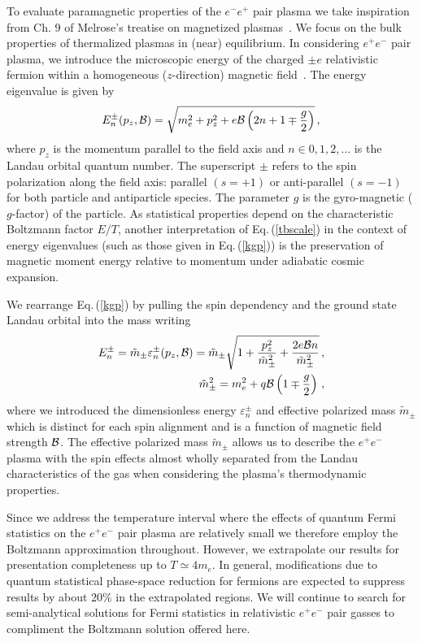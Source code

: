 \documentclass[reprint]{revtex4-2}
\newcommand{\req}[1]{Eq.\,(\ref{#1})}
\newcommand*{\xblue}{\color{black}}
\begin{document}
To evaluate paramagnetic properties of the $e^-e^+$ pair plasma we take inspiration from Ch. 9 of Melrose's treatise on magnetized plasmas~\cite{melrose2008quantum}. We focus  on the bulk properties of thermalized plasmas in (near) equilibrium. In considering $e^{+}e^{-}$ pair plasma, we introduce the microscopic energy of the charged $\pm e$ relativistic fermion within a homogeneous ($z$-direction) magnetic field~\cite{steinmetz2018magnetic}. The energy eigenvalue is given by
\begin{align}
    \label{kgp}
    E^{\pm}_{n}(p_{z},{\cal B})=\sqrt{m_{e}^{2}+p_{z}^{2}+e{\cal B}\left(2n+1\mp\frac{g}{2}\right)}\,,
\end{align}
where $p_{z}$ is the momentum parallel to the field axis and $n\in0,1,2,\ldots$ is the Landau orbital quantum number. The {\xblue superscript} $\pm$ refers to the spin polarization along the field axis: parallel $(s=+1)$ or anti-parallel $(s=-1)$ {\xblue for both particle and antiparticle species.} The parameter $g$ is the gyro-magnetic ($g$-factor) of the particle. As statistical properties depend on the characteristic Boltzmann factor $E/T$, another interpretation of \req{tbscale} in the context of energy eigenvalues (such as those given in \req{kgp}) is the preservation of magnetic moment energy relative to momentum under adiabatic cosmic expansion.

We rearrange \req{kgp} by pulling the spin dependency and the ground state Landau orbital into the mass writing
\begin{align}
    \label{effmass}
    E^{\pm}_{n}={\tilde m}_{\pm}\varepsilon_{n}^{\pm}(p_{z},{\cal B})={\tilde m}_{\pm}\sqrt{1+\frac{p_{z}^{2}}{{\tilde m}_{\pm}^{2}}+\frac{2e{\cal B}n}{{\tilde m}_{\pm}^{2}}}\,,\\
    {\tilde m}_{\pm}^{2}=m_{e}^{2}+q{\cal B}\left(1\mp\frac{g}{2}\right)\,,
\end{align}
where we introduced the {\xblue dimensionless energy $\varepsilon^{\pm}_{n}$ and} effective polarized mass ${\tilde m}_{\pm}$ which is distinct for each spin alignment and is a function of magnetic field strength ${\cal B}$. The effective polarized mass ${\tilde m}_{\pm}$ allows us to describe the $e^{+}e^{-}$ plasma with the spin effects almost wholly separated from the Landau characteristics of the gas when considering the plasma's thermodynamic properties.

Since {\xblue we address} the temperature interval where {\xblue the effects of quantum Fermi statistics on the $e^{+}e^{-}$ pair plasma} are relatively small we therefore employ the Boltzmann approximation throughout. However, we extrapolate our results for presentation completeness up to $T\simeq 4m_{e}$. In general, modifications due to quantum statistical phase-space reduction for fermions are expected to {\xblue suppress results} by about 20\% {\xblue in the extrapolated regions}. We will continue to search for semi-analytical solutions for Fermi statistics in relativistic $e^{+}e^{-}$ pair gasses {\xblue to compliment the} Boltzmann solution offered here. 
\end{document}
